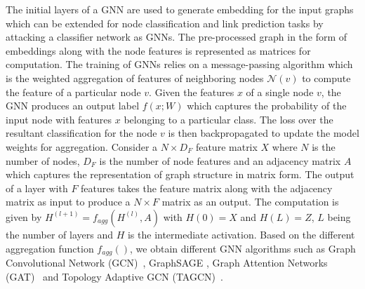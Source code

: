 The initial layers of a GNN are used to generate embedding for the input graphs which can be extended for node classification and link prediction tasks by attacking a classifier network as GNNs.
The pre-processed graph in the form of embeddings along with the node features is represented as matrices for computation.
The training of GNNs relies on a message-passing algorithm which is the weighted aggregation of features of neighboring nodes $\mathcal{N}(v)$ to compute the feature of a particular node $v$.
Given the features $x$ of a single node $v$, the GNN produces an output label $f(x;W)$ which captures the probability of the input node with features $x$ belonging to a particular class.
The loss over the resultant classification for the node $v$ is then backpropagated to update the model weights for aggregation.
Consider a $N\times D_F$ feature matrix $X$ where $N$ is the number of nodes, $D_F$ is the number of node features and an adjacency matrix $A$ which captures the representation of graph structure in matrix form.
The output of a layer with $F$ features takes the feature matrix along with the adjacency matrix as input to produce a $N\times F$ matrix as an output.
The computation is given by $H^{(l+1)} = f_{agg}(H^{(l)}, A)$ with $H(0)=X$ and $H(L)=Z$, $L$ being the number of layers and $H$ is the intermediate activation.
Based on the different aggregation function $f_{agg}()$, we obtain different GNN algorithms such as Graph Convolutional Network (GCN)~\cite{Kipf2016tc}, GraphSAGE \cite{NIPS20176703}, Graph Attention Networks (GAT)~\cite{velickovic2018graph} and Topology Adaptive GCN (TAGCN)~\cite{du2018topology}.


